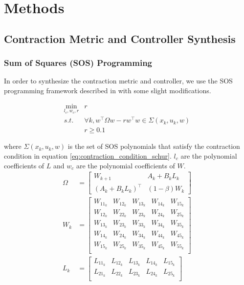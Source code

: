 \documentclass[journal]{IEEEtran}
\begin{document}
\section{Methods}
\subsection{Contraction Metric and Controller Synthesis}
\subsubsection{Sum of Squares (SOS) Programming}
In order to synthesize the contraction metric and controller, we use the SOS programming framework described in \autocite{weiControlContractionMetric2021} with some slight modifications.

\begin{equation}
	\label{eq:dccm_opt}
	\begin{aligned}
	\min_{l_c, w_c, r} & r \\
	s.t. & \forall k, w^\top \Omega w - r w^\top w \in \Sigma(x_k, u_k, w) \\
	& r \geq 0.1
	\end{aligned}
\end{equation}

where $\Sigma(x_k, u_k, w)$ is the set of SOS polynomials that satisfy the contraction condition in equation \ref{eq:contraction_condition_schur}. $l_c$ are the polynomial coefficients of $L$ and $w_c$ are the polynomial coefficients of $W$.
\begin{equation}
	\label{eq:dccm_opt_params}
	\begin{aligned}
	\Omega &=
	\begin{bmatrix}
		W_{k+1} & A_k + B_k L_k \\
		(A_k + B_k L_k)^\top & (1 - \beta) W_k
	\end{bmatrix} \\
	W_k &= 
	\begin{bmatrix}
		W_{11_k} & W_{12_k} & W_{13_k} & W_{14_k} & W_{15_k} \\
		W_{12_k} & W_{22_k} & W_{23_k} & W_{24_k} & W_{25_k} \\
		W_{13_k} & W_{23_k} & W_{33_k} & W_{34_k} & W_{35_k} \\
		W_{14_k} & W_{24_k} & W_{34_k} & W_{44_k} & W_{45_k} \\
		W_{15_k} & W_{25_k} & W_{35_k} & W_{45_k} & W_{55_k} \\
	\end{bmatrix} \\
	L_k &=
	\begin{bmatrix}
		L_{11_k} & L_{12_k} & L_{13_k} & L_{14_k} & L_{15_k} \\
		L_{21_k} & L_{22_k} & L_{23_k} & L_{24_k} & L_{25_k} \\
	\end{bmatrix} \\
	\end{aligned}
\end{equation}
\end{document}
